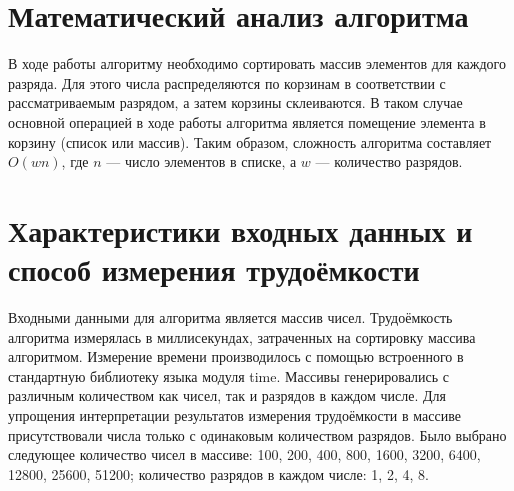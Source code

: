 \documentclass[a4paper]{article}
\begin{document}
\section{Математический анализ алгоритма}
В ходе работы алгоритму необходимо сортировать массив элементов для каждого разряда. Для этого числа распределяются по корзинам в соответствии с рассматриваемым разрядом, а затем корзины склеиваются. В таком случае основной операцией в ходе работы алгоритма является помещение элемента в корзину (список или массив). Таким образом, сложность алгоритма составляет $O(wn)$, где $n$ — число элементов в списке, а $w$ — количество разрядов.

\section{Характеристики входных данных и способ измерения трудоёмкости}
Входными данными для алгоритма является массив чисел. Трудоёмкость алгоритма измерялась в миллисекундах, затраченных на сортировку массива алгоритмом. Измерение времени производилось с помощью встроенного в стандартную библиотеку языка модуля time. Массивы генерировались с различным количеством как чисел, так и разрядов в каждом числе. Для упрощения интерпретации результатов измерения трудоёмкости в массиве присутствовали числа только с одинаковым количеством разрядов. Было выбрано следующее количество чисел в массиве: 100, 200, 400, 800, 1600, 3200, 6400, 12800, 25600, 51200; количество разрядов в каждом числе: 1, 2, 4, 8.
\end{document}
